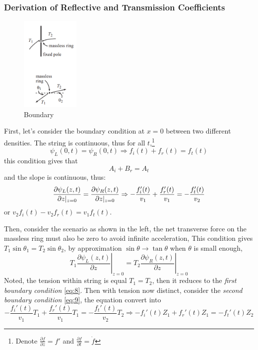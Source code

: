 \documentclass[openany]{book}
\begin{document}
\subsubsection{Derivation of Reflective and Transmission Coefficients}
\begin{figure}
  \vspace{-20pt}  
  \begin{center}
    \includegraphics[width=0.25\textwidth]{Figure/4.PNG}
  \end{center}
  \vspace{-20pt}    
  \caption{Boundary}
  \vspace{-0pt} 
\end{figure}
First, let's consider the boundary condition at $x=0$ between two different densities. The string is continuous, thus for all $t$,\footnote{Denote $\frac{\partial f}{\partial z}=f'$ and $\frac{\partial f}{\partial t}=\dot{f}$} 
\begin{equation}\label{eq:8}
\psi _L(0,t)=\psi _R(0,t)\Rightarrow f_{i}(t)+f_{r}(t)=f_{t}(t)
\end{equation}
this condition gives that
\begin{equation}\label{eq:10}
A_i+B_r=A_t
\end{equation}
and the slope is continuous, thus:
\begin{equation}\label{eq:9}
{\partial \psi _L(z,t)\over \partial z|_{z=0}}={\partial \psi _R(z,t)\over \partial z|_{z=0} }\Rightarrow -\frac{f_i'(t)}{v_1}+\frac{f_r'(t)}{v_1}=-\frac{f_t'(t)}{v_2}
\end{equation}
or $v_2f_i(t)-v_2f_r(t)=v_1f_t(t)$.

Then, consider the scenario as shown in the left, the net transverse force on the massless ring must also be zero to avoid infinite acceleration, This condition gives $T_1\sin \theta_1=T_2\sin \theta_2$, by approximation $\sin \theta \to \tan \theta$ when $\theta$ is small enough,
\[T_1\left.\frac{\partial \psi _L(z,t)}{\partial z}\right|_{z=0}=T_2\left.\frac{\partial \psi _R(z,t)}{\partial z}\right|_{z=0}\]
Noted, the tension within string is equal $T_1=T_2$, then it reduces to the \emph{first boundary condition} \eqref{eq:8}. Then with tension now distinct, consider the \emph{second boundary condition} \eqref{eq:9}, the equation convert into
\[-\frac{f_i'(t)}{v_1}T_1+\frac{f_r'(t)}{v_1}T_1=-\frac{f_t'(t)}{v_2}T_2\Rightarrow -f_i'(t)Z_1+f_r'(t)Z_1=-f_t'(t)Z_2\]
\end{document}
